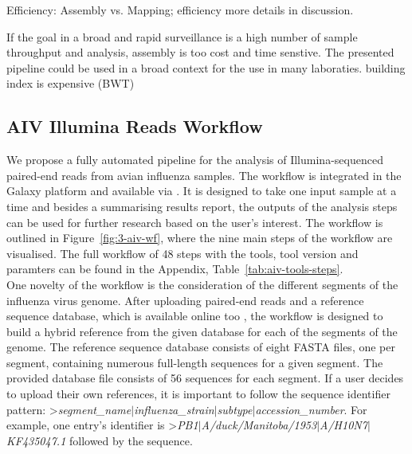 Efficiency: Assembly vs. Mapping; efficiency more details in discussion.

If the goal in a broad and rapid surveillance is a high number of sample throughput and analysis, assembly is too cost and time senstive. The presented pipeline could be used in a broad context for the use in many laboraties.
building index is expensive (BWT)

\subsection{AIV Illumina Reads Workflow}
We propose a fully automated pipeline for the analysis of Illumina-sequenced paired-end reads from avian influenza samples. The workflow is integrated in the Galaxy platform and available via . It is designed to take one input sample at a time and besides a summarising results report, the outputs of the analysis steps can be used for further research based on the user's interest. The workflow is outlined in Figure~\ref{fig:3-aiv-wf}, where the nine main steps of the workflow are visualised. The full workflow of 48 steps with the tools, tool version and paramters can be found in the Appendix, Table~\ref{tab:aiv-tools-steps}. \\
One novelty of the workflow is the consideration of the different segments of the influenza virus genome. After uploading paired-end reads and a reference sequence database, which is available online too , the workflow is designed to build a hybrid reference from the given database for each of the segments of the genome. The reference sequence database consists of eight FASTA files, one per segment, containing numerous full-length sequences for a given segment. The provided database file consists of 56 sequences for each segment. If a user decides to upload their own references, it is important to follow the sequence identifier pattern: >\textit{segment\_name$\mid$influenza\_strain$\mid$subtype$\mid$accession\_number}. For example, one entry's identifier is >\textit{PB1$\mid$A/duck/Manitoba/1953$\mid$A/H10N7$\mid$KF435047.1} followed by the sequence. 


